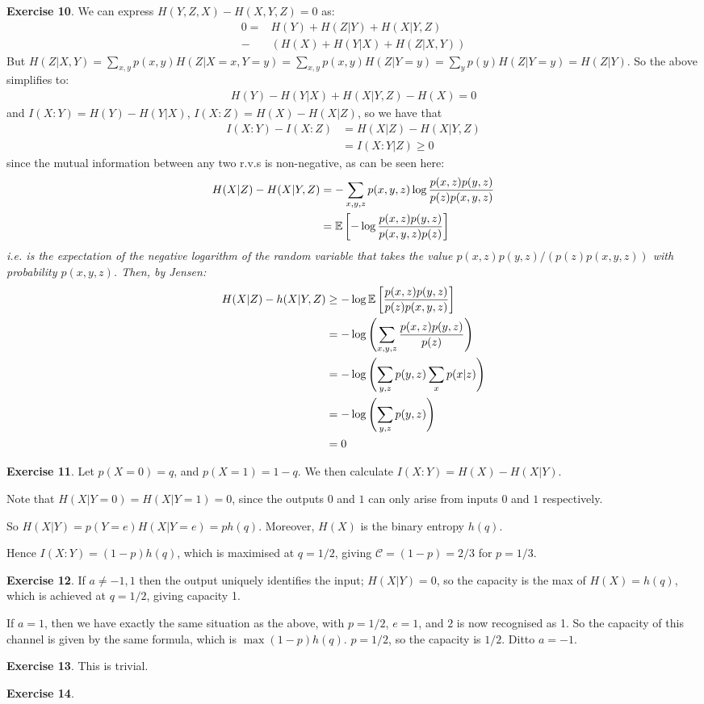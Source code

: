 \documentclass[]{article}
\begin{document}
\textbf{Exercise 10}. We can express $H(Y,Z,X) - H(X,Y,Z) = 0$ as:
\begin{align*}
    0 =& H(Y) + H(Z|Y) + H(X| Y,Z)\\
    -&(H(X) + H(Y|X) + H(Z|X,Y))
\end{align*}
But $H(Z|X,Y) = \sum_{x,y}p(x,y)H(Z|X=x,Y=y) = \sum_{x,y}p(x,y)H(Z|Y=y) = \sum_{y}p(y)H(Z|Y=y) = H(Z|Y)$. So the above simplifies to:
\begin{align*}
    H(Y) - H(Y|X) + H(X|Y,Z) - H(X) = 0
\end{align*}
and $I(X:Y) = H(Y) - H(Y|X)$, $I(X:Z) = H(X) - H(X|Z)$, so we have that 
\begin{align*}
    I(X:Y) - I(X:Z) &= H(X|Z) - H(X|Y,Z)\\
    & = I(X:Y|Z) \ge 0
\end{align*}
since the mutual information between any two r.v.s is non-negative, as can be seen here:
\begin{align*}
    H(X|Z) - H(X|Y,Z) & = -\sum_{x,y,z} p(x,y,z)\log \frac{p(x,z)p(y,z)}{p(z)p(x,y,z)}\\
    & = \mathbb{E}\left[ -\log \frac{p(x,z)p(y,z)}{p(x,y,z)p(z)}   \right]
\end{align*}
\it{i.e.} is the expectation of the negative logarithm of the random variable that takes the value $p(x,z)p(y,z)/(p(z)p(x,y,z))$ with probability $p(x,y,z)$. Then, by Jensen:
\begin{align*}
    H(X|Z) - h(X|Y,Z) & \ge -\log \mathbb{E} \left[  \frac{p(x,z)p(y,z)}{p(z)p(x,y,z)}  \right]\\
    & = -\log \left(  \sum_{x,y,z}\frac{p(x,z)p(y,z)}{p(z)}  \right)\\
    &= - \log \left (\sum_{y,z}p(y,z)\sum_{x}p(x|z)\right)\\
    & = -\log \left( \sum_{y,z}p(y,z)\right)\\
    &= 0
\end{align*}

\textbf{Exercise 11}. Let $p(X=0) = q$, and $p(X=1) = 1-q$. We then calculate $I(X:Y) = H(X) - H(X|Y)$.

Note that $H(X|Y=0) = H(X|Y = 1) = 0$, since the outputs $0$ and $1$ can only arise from inputs $0$ and $1$ respectively.

So $H(X|Y) = p(Y=e)H(X|Y=e) = ph(q)$. Moreover, $H(X)$ is the binary entropy $h(q)$.

Hence $I(X:Y) = (1-p)h(q)$, which is maximised at $q = 1/2$, giving $\mathcal{C} = (1-p) = 2/3$ for $p = 1/3$.

\textbf{Exercise 12}. If $a\ne -1,1$ then the output uniquely identifies the input; $H(X|Y) = 0$, so the capacity is the max of $H(X) = h(q)$, which is achieved at $q = 1/2$, giving capacity 1.

If $a = 1$, then we have exactly the same situation as the above, with $p = 1/2$, $e = 1$, and $2$ is now recognised as 1. So the capacity of this channel is given by the same formula, which is $\max (1-p)h(q)$. $p = 1/2$, so the capacity is $1/2$. Ditto $a = -1$.

\textbf{Exercise 13}. This is trivial.

\textbf{Exercise 14}. 
\end{document}
